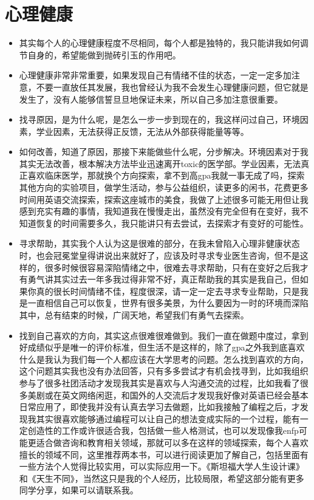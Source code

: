 \documentclass[zihao=-4,fontset=none]{Beautybook-CN}
\begin{document}
\section{心理健康}
\begin{itemize}
\item 其实每个人的心理健康程度不尽相同，每个人都是独特的，我只能讲我如何调节自身的，希望能做到抛砖引玉的作用吧。
\item 心理健康非常非常重要，如果发现自己有情绪不佳的状态，一定一定多加注意，不要一直放任其发展，我也曾经认为我不会发生心理健康问题，但它就是发生了，没有人能够信誓旦旦地保证未来，所以自己多加注意很重要。
\item 找寻原因，是为什么呢，是怎么一步一步到现在的，我这样问过自己，环境因素，学业因素，无法获得正反馈，无法从外部获得能量等等。
\item 如何改善，知道了原因，那接下来能做些什么呢，分步解决。环境因素对于我其实无法改善，根本解决方法\textemdash{}\textemdash{}毕业迅速离开toxic的医学部。学业因素，无法真正喜欢临床医学，那就换个方向探索，拿不到高gpa我就一事无成了吗，探索其他方向的实验项目，做学生活动，参与公益组织，读更多的闲书，花费更多时间用英语交流探索，探索这座城市的美食，我做了上述很多可能无用但让我感到充实有趣的事情，我知道我在慢慢走出，虽然没有完全但有在变好，我不知道恢复的时间需要多久，我只能讲只有去尝试，去探索才有变好的可能性。
\item 寻求帮助，其实我个人认为这是很难的部分，在我未曾陷入心理非健康状态时，也会冠冕堂皇得讲说出来就好了，应该及时寻求专业医生咨询，但不是这样的，很多时候很容易深陷情绪之中，很难去寻求帮助，只有在变好之后我才有勇气讲其实过去一年多我过得非常不好，真正帮助我的其实是我自己，但如果你真的很长时间情绪不佳，程度很深，请一定一定去寻求专业帮助，只是我是一直相信自己可以恢复，世界有很多美景，为什么要因为一时的环境而深陷其中，总有结束的时候，广阔天地，希望我们有勇气去探索。
\item 找到自己喜欢的方向，其实这点很难很难做到。我们一直在做题中度过，拿到好成绩似乎是唯一的评价标准，但生活不是这样的，除了gpa之外我到底喜欢什么是我认为我们每一个人都应该在大学思考的问题。怎么找到喜欢的方向，这个问题其实我也没有办法回答，只有多多尝试才有机会找寻到，比如我组织参与了很多社团活动才发现我其实是喜欢与人沟通交流的过程，比如我看了很多美剧或在英文网络闲逛，和国外的人交流后才发现我好像对英语已经会基本日常应用了，即使我并没有认真去学习去做题，比如我接触了编程之后，才发现我其实很喜欢能够通过编程可以让自己的想法变成实际的一个过程，能有一定创造性的工作或许很适合我，包括做一些人格测试，也可以发现像我enfp可能更适合做咨询和教育相关领域，那就可以多在这样的领域探索，每个人喜欢擅长的领域不同，这里推荐两本书，可以进行阅读更加了解自己，包括里面有一些方法个人觉得比较实用，可以实际应用一下。《斯坦福大学人生设计课》和《天生不同》，当然这只是我的个人经历，比较局限，希望这部分能有更多同学分享，如果可以请联系我。

\end{itemize}
\end{document}

